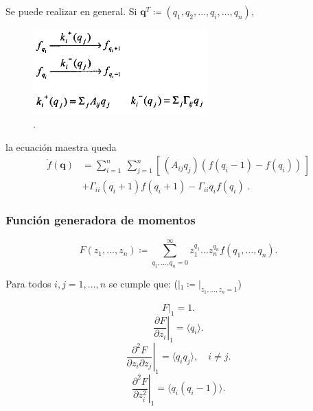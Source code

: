 \documentclass[10pt]{beamer}
\begin{document}
\begin{frame}
Se puede realizar en general. Si $\mathbf{q}^T \coloneqq (q_1,q_2,\dots,q_i,\dots,q_n)$, 
\begin{figure}[p]
    \centering
    \includegraphics[width=0.6\textwidth]{scheme2.png}\\
    \tiny \cite{thattai01}.
\end{figure}
la ecuaci\'on maestra queda
\begin{align*}
\dot{f}(\mathbf{q}) &= \sum_{i=1}^n \: \sum_{j=1}^n \left[\, \left(A_{ij}q_j\right) \left(f(q_i-1) - f(q_i)\right) \, \right] \\
 & + \Gamma_{ii}(q_{i}+1)f(q_i+1) -\Gamma_{ii}q_if(q_i) \: .
\end{align*}
\end{frame}

\begin{frame}
\frametitle{Funci\'on generadora de momentos}

$$F(z_1,\dots,z_n) \coloneqq \sum^{\infty}_{q_1,\dots,q_n = 0}z_1^{q_1} \dots z_n^{q_n}f(q_1,\dots,q_n).$$

Para todos $i, j = 1,\dots,n$  se cumple que: ($|_1 \coloneqq |_{z_1,\dots,z_n=1}$)

$$ \left. F\right|_1 = 1. $$
$$ \left. \frac{\partial F}{\partial z_i} \right|_1 = \langle q_i \rangle. $$
$$ \left. \frac{\partial^2 F}{\partial z_i \partial z_j} \right|_1 = \langle q_iq_j \rangle, \quad i\neq j.$$
$$ \left. \frac{\partial^2 F}{\partial z_i^2} \right|_1 = \langle q_i(q_i - 1) \rangle. $$
\end{frame}
\end{document}
